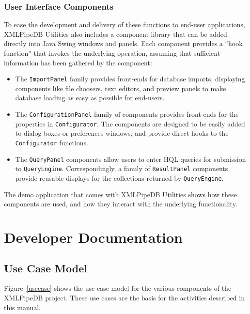 \documentclass[11pt]{article}
\begin{document}
\subsubsection{User Interface Components}

To ease the development and delivery of these functions to end-user applications, XMLPipeDB Utilities also includes a component library that can be added directly into Java Swing windows and panels.  Each component provides a ``hook function'' that invokes the underlying operation, assuming that sufficient information has been gathered by the component:
\begin{itemize}
\item The \texttt{ImportPanel} family provides front-ends for database imports, displaying components like file choosers, text editors, and preview panels to make database loading as easy as possible for end-users.

\item The \texttt{ConfigurationPanel} family of components provides front-ends for the properties in \texttt{Configurator}.  The components are designed to be easily added to dialog boxes or preferences windows, and provide direct hooks to the \texttt{Configurator} functions.

\item The \texttt{QueryPanel} components allow users to enter HQL queries for submission to \texttt{QueryEngine}.  Correspondingly, a family of \texttt{ResultPanel} components provide reusable displays for the collections returned by \texttt{QueryEngine}.
\end{itemize}
The demo application that comes with XMLPipeDB Utilities shows how these components are used, and how they interact with the underlying functionality.

\section{Developer Documentation}
\label{dev}

\subsection{Use Case Model}

Figure~\ref{usecase} shows the use case model for the various components of the XMLPipeDB project.  These use cases are the basis for the activities described in this manual.
\end{document}
